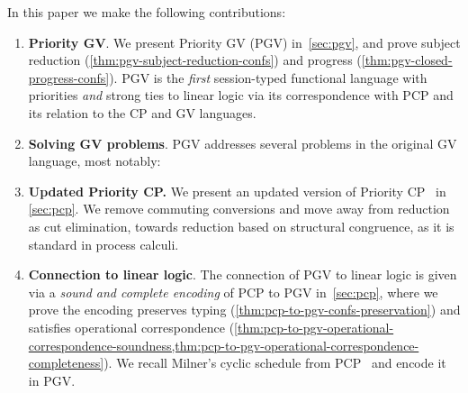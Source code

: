 \documentclass[main.tex]{subfiles}
\begin{document}
In this paper we make the following contributions:
\begin{enumerate}
\item \textbf{Priority GV}. We present Priority GV (PGV) in~\cref{sec:pgv}, and prove subject reduction (\cref{thm:pgv-subject-reduction-confs}) and progress (\cref{thm:pgv-closed-progress-confs}).
PGV is the \emph{first} session-typed functional language with priorities \emph{and} strong ties to linear logic via its correspondence with PCP and its relation to the CP and GV languages.
\item \textbf{Solving GV problems}. PGV addresses several problems in the original GV language, most notably:
\item \textbf{Updated Priority CP.} We present an updated version of Priority CP~\cite{dardhagay18} in \cref{sec:pcp}. We remove commuting conversions and move away from reduction as cut elimination, towards reduction based on structural congruence, as it is standard in process calculi.
\item \textbf{Connection to linear logic}. The connection of PGV to linear logic is given via a \emph{sound and complete encoding} of PCP to PGV in~\cref{sec:pcp}, where we prove the encoding preserves typing (\cref{thm:pcp-to-pgv-confs-preservation}) and satisfies operational correspondence (\cref{thm:pcp-to-pgv-operational-correspondence-soundness,thm:pcp-to-pgv-operational-correspondence-completeness}). We recall Milner's cyclic schedule from PCP~\cite{dardhagay18} and encode it in PGV.
\end{enumerate}
\end{document}

